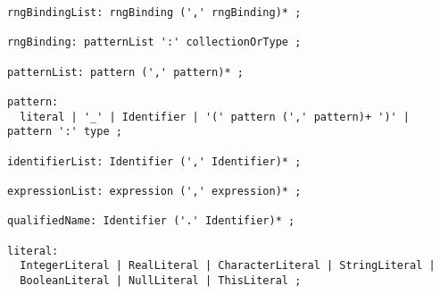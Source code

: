 {\begin{verbatim}
rngBindingList: rngBinding (',' rngBinding)* ;

rngBinding: patternList ':' collectionOrType ;

patternList: pattern (',' pattern)* ;

pattern:
  literal | '_' | Identifier | '(' pattern (',' pattern)+ ')' | pattern ':' type ;
  
identifierList: Identifier (',' Identifier)* ;

expressionList: expression (',' expression)* ;
    
qualifiedName: Identifier ('.' Identifier)* ;

literal:
  IntegerLiteral | RealLiteral | CharacterLiteral | StringLiteral | 
  BooleanLiteral | NullLiteral | ThisLiteral ;
\end{verbatim}
}

